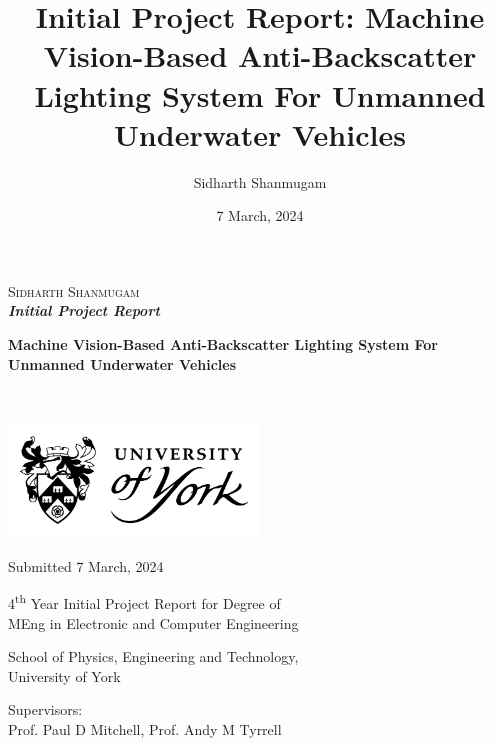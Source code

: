 \documentclass[12pt]{article}
\title{Initial Project Report: Machine Vision-Based Anti-Backscatter Lighting System For Unmanned Underwater Vehicles}
\author{Sidharth Shanmugam}
\date{7 March, 2024}
\begin{document}
\begin{onehalfspace}
    \begin{titlepage}

        \begin{FlushLeft}
            \textsc{\LARGE Sidharth Shanmugam}\\[0.8cm]
    
            \Large{
                \bfseries{
                    \emph{Initial Project Report}}}
            
            \hrulefill
    
            \huge{
                \bfseries{
                    Machine Vision-Based Anti-Backscatter Lighting System For Unmanned Underwater Vehicles}}
            
            \hrulefill\\[4cm]
    
        \end{FlushLeft}
        
        \vfill

        \begin{Center}
    
            \includegraphics[width=0.5\textwidth]{assets/uoy-logo-stacked-shield.png}

            \vfill
    
            \textsf{
                \large{
                    Submitted 7 March, 2024}}
    
            \vfill
    
            \textsf{
                \large{
                    4\textsuperscript{th} Year Initial Project Report for Degree of\\ MEng in Electronic and Computer Engineering}}
    
            \vfill
            
            \textsf{
                \large{
                    School of Physics, Engineering and Technology,\\ University of York}}
    
            \vfill
    
            \textsf{
                \large{
                    Supervisors:\\[0.2cm] Prof. Paul D Mitchell, Prof. Andy M Tyrrell}}
        
        \end{Center}
        
    \end{titlepage}
\end{onehalfspace}
\end{document}
